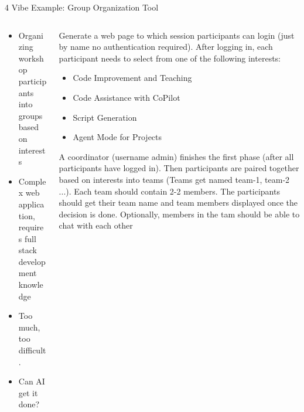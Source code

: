 \documentclass[xcolor={dvipsnames,table}, aspectratio=169]{beamer}
\begin{document}
\begin{frame}{4 Vibe Example: Group Organization Tool}
  \begin{columns}
    \begin{column}{0.5\textwidth}
      \begin{itemize}
        \item Organizing workshop participants into groups based on interests
        \item Complex web application, requires full stack development knowledge
        \item Too much, too difficult.
        \item Can AI get it done?
      \end{itemize}
    \end{column}
    
    \begin{column}{0.5\textwidth}
      \begin{promptbox}\footnotesize
        Generate a web page to which session participants can login (just by name no authentication required). After logging in, each participant needs to select from one of the following interests:
        \begin{itemize}\vspace{-0.5em}
          \item Code Improvement and Teaching
          \vspace{-0.5em}
          \item Code Assistance with CoPilot
          \vspace{-0.5em}
          \item Script Generation
          \vspace{-0.5em}
          \item Agent Mode for Projects
          \vspace{-0.5em}
       \end{itemize}
A coordinator (username admin) finishes the first phase (after all participants have logged in). Then participants are paired together based on interests into teams (Teams get named team-1, team-2 ...). Each team should contain 2-2 members. The participants should get their team name and team members displayed once the decision is done. Optionally, members in the tam should be able to chat with each other
      \end{promptbox}
    \end{column}
  \end{columns}
\end{frame}
\end{document}
